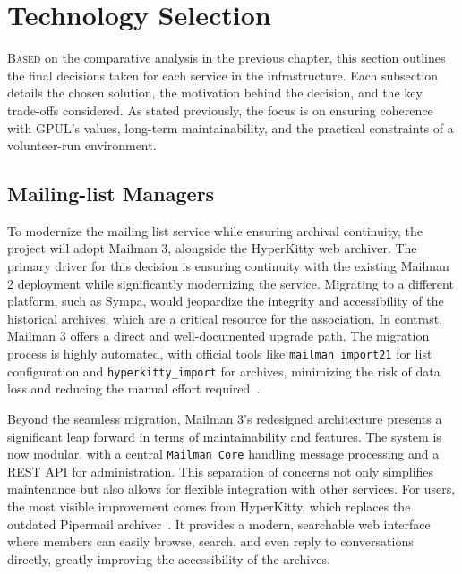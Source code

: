 %

\chapter{Technology Selection}
\label{chap:technology-selection}

\lettrine{B}{ased} on the comparative analysis in the previous chapter, this section outlines the final decisions taken for each service in the infrastructure.  
Each subsection details the chosen solution, the motivation behind the decision, and the key trade-offs considered.  
As stated previously, the focus is on ensuring coherence with GPUL's values, long-term maintainability, and the practical constraints of a volunteer-run environment.

\section{Mailing-list Managers}

To modernize the mailing list service while ensuring archival continuity, the project will adopt Mailman 3, alongside the HyperKitty web archiver. The primary driver for this decision is ensuring continuity with the existing Mailman 2 deployment while significantly modernizing the service. Migrating to a different platform, such as Sympa, would jeopardize the integrity and accessibility of the historical archives, which are a critical resource for the association. In contrast, Mailman 3 offers a direct and well-documented upgrade path. The migration process is highly automated, with official tools like \texttt{mailman import21} for list configuration and \texttt{hyperkitty\_import} for archives, minimizing the risk of data loss and reducing the manual effort required~\cite{mailman3-migration}.

Beyond the seamless migration, Mailman 3's redesigned architecture presents a significant leap forward in terms of maintainability and features. The system is now modular, with a central \texttt{Mailman Core} handling message processing and a REST API for administration. This separation of concerns not only simplifies maintenance but also allows for flexible integration with other services. For users, the most visible improvement comes from HyperKitty, which replaces the outdated Pipermail archiver~\cite{hyperkitty-docs}. It provides a modern, searchable web interface where members can easily browse, search, and even reply to conversations directly, greatly improving the accessibility of the archives.

